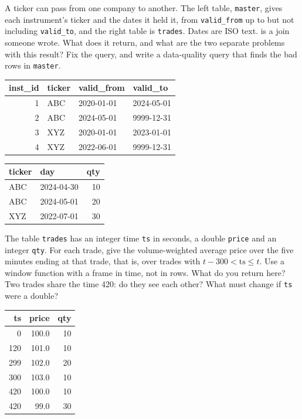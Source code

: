 \begin{question}\label{iq:iv3:sql-and-data:22}
A ticker can pass from one company to another. The left table, \texttt{master}, gives each instrument's ticker and the dates it held it, from \texttt{valid\_from} up to but not including \texttt{valid\_to}, and the right table is \texttt{trades}. Dates are ISO text.  is a join someone wrote. What does it return, and what are the two separate problems with this result? Fix the query, and write a data-quality query that finds the bad rows in \texttt{master}.
\begin{center}\small
\begin{tabular}{rlll}
inst\_id & ticker & valid\_from & valid\_to\\\hline
1 & ABC & 2020-01-01 & 2024-05-01\\
2 & ABC & 2024-05-01 & 9999-12-31\\
3 & XYZ & 2020-01-01 & 2023-01-01\\
4 & XYZ & 2022-06-01 & 9999-12-31
\end{tabular}\qquad
\begin{tabular}{llr}
ticker & day & qty\\\hline
ABC & 2024-04-30 & 10\\
ABC & 2024-05-01 & 20\\
XYZ & 2022-07-01 & 30
\end{tabular}
\end{center}
\label{lst:iv3:sq:pit}
\end{question}

\begin{question}\label{iq:iv3:sql-and-data:23}
The table \texttt{trades} has an integer time \texttt{ts} in seconds, a double \texttt{price} and an integer \texttt{qty}. For each trade, give the volume-weighted average price over the five minutes ending at that trade, that is, over trades with $t - 300 < \text{ts} \le t$. Use a window function with a frame in time, not in rows. What do you return here? Two trades share the time 420: do they see each other? What must change if \texttt{ts} were a double?
\begin{center}\small
\begin{tabular}{rrr}
ts & price & qty\\\hline
0 & 100.0 & 10\\
120 & 101.0 & 10\\
299 & 102.0 & 20\\
300 & 103.0 & 10\\
420 & 100.0 & 10\\
420 & 99.0 & 30
\end{tabular}
\end{center}
\end{question}

